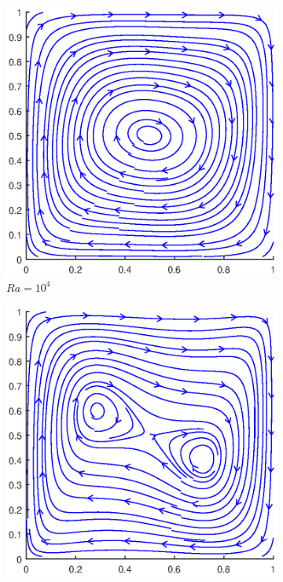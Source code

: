 \begin{figure}[h]
\begin{subfigure}{0.5\textwidth}
		\includegraphics[scale=0.61]{Buoyancy/4}
		\caption{$Ra=10^{4}$}
	\end{subfigure}
	\begin{subfigure}{0.5\textwidth}
		\includegraphics[scale=0.61]{Buoyancy/5}

\end{subfigure}
\end{figure}
